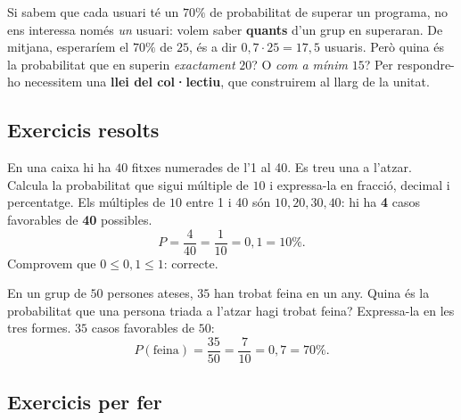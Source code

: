\begin{exemple}
Si sabem que cada usuari té un $70\%$ de probabilitat de superar un programa, no ens
interessa només \emph{un} usuari: volem saber \textbf{quants} d'un grup en superaran. De
mitjana, esperaríem el $70\%$ de $25$, és a dir $0,7\cdot 25=17,5$ usuaris. Però quina
és la probabilitat que en superin \emph{exactament} $20$? O \emph{com a mínim} $15$? Per
respondre-ho necessitem una \textbf{llei del col·lectiu}, que construirem al llarg de la
unitat.
\end{exemple}

\subsection{Exercicis resolts}

\begin{exresolt}
En una caixa hi ha $40$ fitxes numerades de l'1 al 40. Es treu una a l'atzar. Calcula la
probabilitat que sigui múltiple de $10$ i expressa-la en fracció, decimal i percentatge.
\solucio
Els múltiples de $10$ entre 1 i 40 són $10,20,30,40$: hi ha \textbf{4} casos favorables
de \textbf{40} possibles.
\[
P=\frac{4}{40}=\frac{1}{10}=0,1=10\%.
\]
Comprovem que $0\le 0,1\le 1$: correcte.
\end{exresolt}

\begin{exresolt}
En un grup de $50$ persones ateses, $35$ han trobat feina en un any. Quina és la
probabilitat que una persona triada a l'atzar hagi trobat feina? Expressa-la en les tres
formes.
\solucio
$35$ casos favorables de $50$:
\[
P(\text{feina})=\frac{35}{50}=\frac{7}{10}=0,7=70\%.
\]
\end{exresolt}

\subsection{Exercicis per fer}

